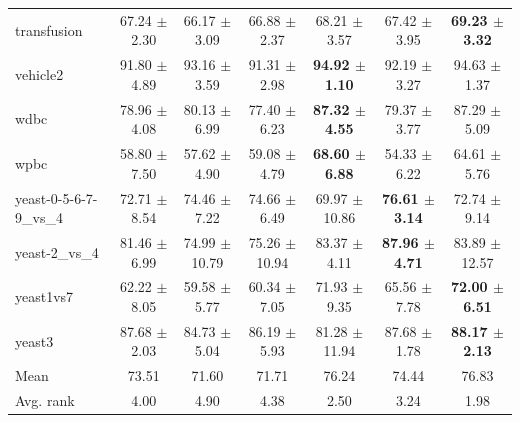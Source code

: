 \begin{table}[t]
\begin{tabular}{lcccccc}
transfusion & 67.24 $\pm$ 2.30 & 66.17 $\pm$ 3.09 & 66.88 $\pm$ 2.37 & 68.21 $\pm$ 3.57 & 67.42 $\pm$ 3.95 & \textbf{69.23 $\pm$ 3.32} \\
vehicle2 & 91.80 $\pm$ 4.89 & 93.16 $\pm$ 3.59 & 91.31 $\pm$ 2.98 & \textbf{94.92 $\pm$ 1.10} & 92.19 $\pm$ 3.27 & 94.63 $\pm$ 1.37 \\
wdbc & 78.96 $\pm$ 4.08 & 80.13 $\pm$ 6.99 & 77.40 $\pm$ 6.23 & \textbf{87.32 $\pm$ 4.55} & 79.37 $\pm$ 3.77 & 87.29 $\pm$ 5.09 \\
wpbc & 58.80 $\pm$ 7.50 & 57.62 $\pm$ 4.90 & 59.08 $\pm$ 4.79 & \textbf{68.60 $\pm$ 6.88} & 54.33 $\pm$ 6.22 & 64.61 $\pm$ 5.76 \\
yeast-0-5-6-7-9\_vs\_4 & 72.71 $\pm$ 8.54 & 74.46 $\pm$ 7.22 & 74.66 $\pm$ 6.49 & 69.97 $\pm$ 10.86 & \textbf{76.61 $\pm$ 3.14} & 72.74 $\pm$ 9.14 \\
yeast-2\_vs\_4 & 81.46 $\pm$ 6.99 & 74.99 $\pm$ 10.79 & 75.26 $\pm$ 10.94 & 83.37 $\pm$ 4.11 & \textbf{87.96 $\pm$ 4.71} & 83.89 $\pm$ 12.57 \\
yeast1vs7 & 62.22 $\pm$ 8.05 & 59.58 $\pm$ 5.77 & 60.34 $\pm$ 7.05 & 71.93 $\pm$ 9.35 & 65.56 $\pm$ 7.78 & \textbf{72.00 $\pm$ 6.51} \\
yeast3 & 87.68 $\pm$ 2.03 & 84.73 $\pm$ 5.04 & 86.19 $\pm$ 5.93 & 81.28 $\pm$ 11.94 & 87.68 $\pm$ 1.78 & \textbf{88.17 $\pm$ 2.13} \\
\midrule
Mean & 73.51 & 71.60 & 71.71 & 76.24 & 74.44 & 76.83 \\
Avg. rank & 4.00 & 4.90 & 4.38 & 2.50 & 3.24 & 1.98 \\
\bottomrule
\end{tabular}
\end{table}
